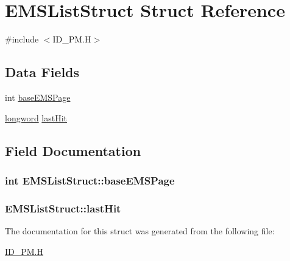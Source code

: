 \hypertarget{structEMSListStruct}{
\section{EMSListStruct Struct Reference}
\label{structEMSListStruct}
}


{\ttfamily \#include $<$ID\_\-PM.H$>$}

\subsection*{Data Fields}
\begin{DoxyCompactItemize}
\item 
int \hyperlink{structEMSListStruct_a796d43f51115ed7425008ab343d295be}{baseEMSPage}
\item 
\hyperlink{ID__HEAD_8H_a8a9a7dd50c6fdb45dcdf0eb929479663}{longword} \hyperlink{structEMSListStruct_a4b5befaa05458fe981ab122c0d496b00}{lastHit}
\end{DoxyCompactItemize}


\subsection{Field Documentation}
\hypertarget{structEMSListStruct_a796d43f51115ed7425008ab343d295be}{
\subsubsection[{baseEMSPage}]{\setlength{\rightskip}{0pt plus 5cm}int {\bf EMSListStruct::baseEMSPage}}}
\label{structEMSListStruct_a796d43f51115ed7425008ab343d295be}
\hypertarget{structEMSListStruct_a4b5befaa05458fe981ab122c0d496b00}{
\subsubsection[{lastHit}]{ {\bf EMSListStruct::lastHit}}}
\label{structEMSListStruct_a4b5befaa05458fe981ab122c0d496b00}


The documentation for this struct was generated from the following file:\begin{DoxyCompactItemize}
\item 
\hyperlink{ID__PM_8H}{ID\_\-PM.H}\end{DoxyCompactItemize}
